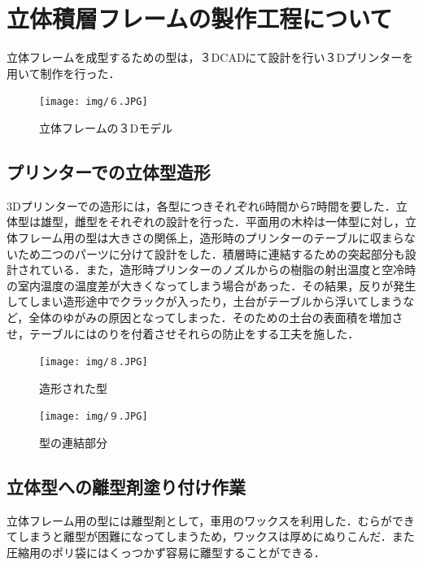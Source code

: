 
\chapter{立体積層フレームの製作工程について}
立体フレームを成型するための型は，３DCADにて設計を行い３Dプリンターを用いて制作を行った．

\begin{figure}[htbp]
  \begin{center}
    \texttt{[image: img/６.JPG]}
    \end{center}
  \caption{立体フレームの３Dモデル}
 \label{fig:robot}
\end{figure}

\section{プリンターでの立体型造形}
3Dプリンターでの造形には，各型につきそれぞれ6時間から7時間を要した．立体型は雄型，雌型をそれぞれの設計を行った．平面用の木枠は一体型に対し，立体フレーム用の型は大きさの関係上，造形時のプリンターのテーブルに収まらないため二つのパーツに分けて設計をした．積層時に連結するための突起部分も設計されている．また，造形時プリンターのノズルからの樹脂の射出温度と空冷時の室内温度の温度差が大きくなってしまう場合があった．その結果，反りが発生してしまい造形途中でクラックが入ったり，土台がテーブルから浮いてしまうなど，全体のゆがみの原因となってしまった．そのための土台の表面積を増加させ，テーブルにはのりを付着させそれらの防止をする工夫を施した．

\begin{figure}[htbp]
  \begin{center}
    \texttt{[image: img/８.JPG]}
    \end{center}
  \caption{造形された型}
 \label{fig:robot}
\end{figure}

\begin{figure}[htbp]
  \begin{center}
    \texttt{[image: img/９.JPG]}
    \end{center}
  \caption{型の連結部分}
 \label{fig:robot}
\end{figure}

\section{立体型への離型剤塗り付け作業}
立体フレーム用の型には離型剤として，車用のワックスを利用した．むらができてしまうと離型が困難になってしまうため，ワックスは厚めにぬりこんだ．また圧縮用のポリ袋にはくっつかず容易に離型することができる．


